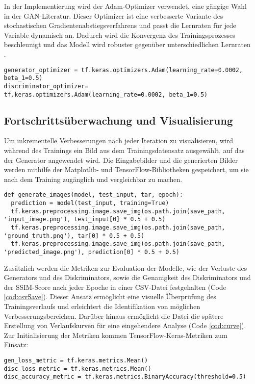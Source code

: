 In der Implementierung wird der Adam-Optimizer verwendet, eine gängige Wahl in der GAN-Literatur. Dieser Optimizer ist eine verbesserte Variante des stochastischen Gradientenabstiegsverfahrens und passt die Lernraten für jede Variable dynamisch an. Dadurch wird die Konvergenz des Trainingsprozesses beschleunigt und das Modell wird robuster gegenüber unterschiedlichen Lernraten \cite{Kingma.2014}.

\begin{lstlisting}[language=pyhaff, caption={Initialisierung der Adam-Optimizers aus der Pix2Pix Implementierung}, label={cod:optimizer}]
generator_optimizer = tf.keras.optimizers.Adam(learning_rate=0.0002, beta_1=0.5)
discriminator_optimizer= tf.keras.optimizers.Adam(learning_rate=0.0002, beta_1=0.5)
\end{lstlisting}

\subsection{Fortschrittsüberwachung und Visualisierung}
Um inkrementelle Verbesserungen nach jeder Iteration zu visualisieren, wird während des Trainings ein Bild aus dem Trainingsdatensatz ausgewählt, auf das der Generator angewendet wird. Die Eingabebilder und die generierten Bilder werden mithilfe der Matplotlib- und TensorFlow-Bibliotheken gespeichert, um sie nach dem Training zugänglich und vergleichbar zu machen. 

\begin{lstlisting}[language=pyhaff, caption={Speicherung der generierten Bilder}, label={cod:optimizer}]
def generate_images(model, test_input, tar, epoch):
  prediction = model(test_input, training=True)
  tf.keras.preprocessing.image.save_img(os.path.join(save_path, 'input_image.png'), test_input[0] * 0.5 + 0.5)
  tf.keras.preprocessing.image.save_img(os.path.join(save_path, 'ground_truth.png'), tar[0] * 0.5 + 0.5)
  tf.keras.preprocessing.image.save_img(os.path.join(save_path, 'predicted_image.png'), prediction[0] * 0.5 + 0.5)
\end{lstlisting}

Zusätzlich werden die Metriken zur Evaluation der Modelle, wie der Verluste des Generators und des Diskriminators, sowie die Genauigkeit des Diskriminators und der SSIM-Score nach jeder Epoche in einer CSV-Datei festgehalten (Code \ref{cod:csvSave}). Dieser Ansatz ermöglicht eine visuelle Überprüfung des Trainingsverlaufs und erleichtert die Identifikation von möglichen Verbesserungsbereichen.
Darüber hinaus ermöglicht die Datei die spätere Erstellung von Verlaufskurven für eine eingehendere Analyse (Code \ref{cod:curve}).
\newpage
Zur Initialisierung der Metriken kommen TensorFlow-Keras-Metriken zum Einsatz:
\begin{lstlisting}[language=pyhaff, caption={Initialisierung der Metriken}, label={cod:initMetrics}]
gen_loss_metric = tf.keras.metrics.Mean()
disc_loss_metric = tf.keras.metrics.Mean()
disc_accuracy_metric = tf.keras.metrics.BinaryAccuracy(threshold=0.5)
\end{lstlisting}

